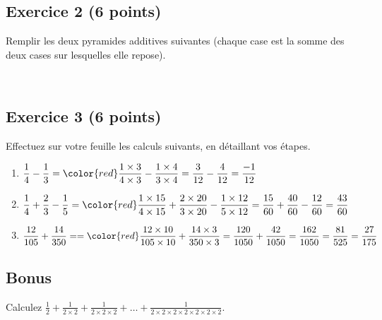 \documentclass[14 pt]{extarticle}
\theoremstyle{plain}
\begin{document}
 \subsection*{Exercice 2 (6 points)}
 Remplir les deux pyramides additives suivantes (chaque case est la somme des deux cases sur lesquelles elle repose). 


\begin{figure}[H]
\center
{}\ 
\end{figure}


\subsection*{Exercice 3 (6 points)}

Effectuez sur votre feuille les calculs suivants, en détaillant vos étapes. 

\begin{enumerate}
\item $\displaystyle \frac14 - \frac13 = \color{red} \frac{1\times3}{4\times3} - \frac{1\times4}{3\times 4} = \frac3{12}-\frac4{12} = \frac{-1}{12}$  

\item $\displaystyle \frac14 + \frac23 - \frac15 = \color{red} \frac{1\times15}{4\times15} + \frac{2\times20}{3\times 20}- \frac{1\times 12}{5\times12} = \frac{15}{60} + \frac{40}{60} - \frac{12}{60} = \frac{43}{60}$   

\item $\displaystyle \frac{12}{105} + \frac{14}{350} = = \color{red} 
\frac{12\times 10}{105\times 10} + \frac{14\times 3}{350\times3} = \frac{120}{1050} + \frac{42}{1050} = \frac{162}{1050} = \frac{81}{525} = \frac{27}{175}$ 
\end{enumerate}

\subsection*{Bonus}
Calculez $\displaystyle \frac12 + \frac1{2 \times 2} + \frac1{2\times 2 \times 2} + \ldots + \frac1{2\times 2\times 2 \times 2 \times 2 \times 2 \times 2}$.
 	
\end{document}
